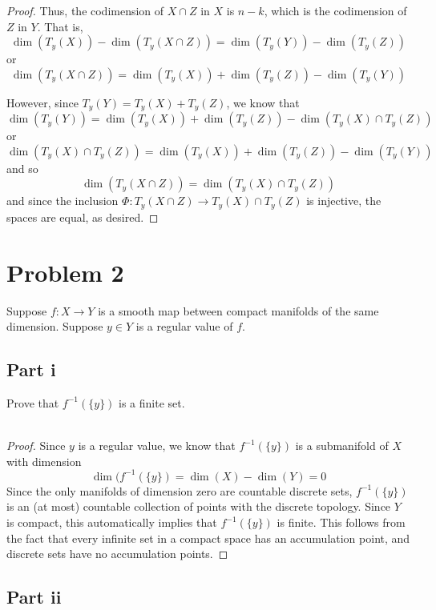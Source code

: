 \documentclass[fontsize=11pt]{scrartcl} %
\numberwithin{equation}{section} %
\numberwithin{figure}{section} %
\numberwithin{table}{section} %
\begin{document}
\begin{proof}
    Thus, the codimension of $X\cap Z$ in $X$ is $n-k$, which is the codimension
    of $Z$ in $Y$. That is,
    \[
        \dim(T_y(X)) - \dim(T_y(X\cap Z)) = \dim(T_y(Y))-\dim(T_y(Z))
    \]
    or
    \[
        \dim(T_y(X\cap Z)) = \dim(T_y(X)) + \dim(T_y(Z))-\dim(T_y(Y))
    \]

    However, since $T_y(Y) = T_y(X) + T_y(Z)$, we know that
    \[
    \dim(T_y(Y)) = \dim(T_y(X)) + \dim(T_y(Z))-\dim(T_y(X)\cap T_y(Z))
    \]
    or
    \[
        \dim(T_y(X)\cap T_y(Z)) = \dim(T_y(X)) + \dim (T_y(Z)) - \dim(T_y(Y))
    \]
    and so
    \[
        \dim(T_y(X\cap Z)) = \dim(T_y(X)\cap T_y(Z))
    \]
    and since the inclusion $\Phi:T_y(X\cap Z)\to T_y(X)\cap T_y(Z)$ is
    injective, the spaces are equal, as desired.
\end{proof}

\newpage

\section*{Problem 2}
Suppose $f:X\to Y$ is a smooth map between compact manifolds of the same
dimension. Suppose $y\in Y$ is a regular value of $f$.

\subsection*{Part i}
Prove that $f^{-1}(\{y\})$ is a finite set.
\\
\\
\begin{proof}
    Since $y$ is a regular value, we know that $f^{-1}(\{y\})$ is a submanifold
    of $X$ with dimension
    \[
        \dim(f^{-1}(\{y\}) = \dim(X)-\dim(Y) = 0
    \]
    Since the only manifolds of dimension zero are countable discrete sets,
    $f^{-1}(\{y\})$ is an (at most) countable collection of points with the
    discrete topology. Since $Y$ is compact, this automatically implies that
    $f^{-1}(\{y\})$ is finite. This follows from the fact that every infinite
    set in a compact space has an accumulation point, and discrete sets have no
    accumulation points.
\end{proof}

\subsection*{Part ii}

\newpage
\end{document}
